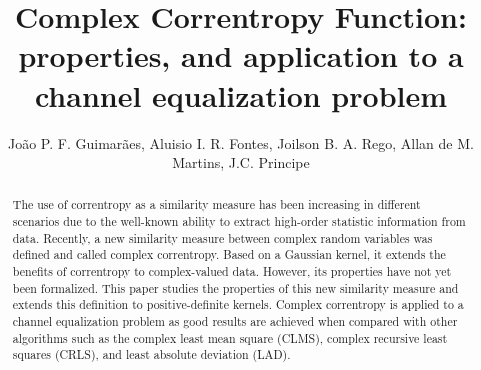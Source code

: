 \documentclass[preprint,12pt]{elsarticle}
\begin{document}
\begin{frontmatter}

\title{Complex Correntropy Function: properties, and application to a channel equalization problem}










\author{Jo\~ao P. F. Guimar\~aes, Aluisio I. R. Fontes, Joilson B. A. Rego, Allan de M. Martins, J.C. Principe}

\address{Federal Institute of Rio Grande do Norte, 59015-300, Natal, Brazil\\
e-mails: \{joao.guimaraes,aluisio.rego\}@ifrn.edu.br}

\address{Department of Computer Engineering and Automation\\
Federal University of Rio Grande do Norte, 59078-900, Natal, Brazil\\
e-mails: \{allan,\,joilson\}@dca.ufrn.br}

\address{Department of Electrical and Computer Engineering\\
University of Florida, Gainesville, FL 32611 USA \\
e-mails: \{principe\}@cnel.ufl.edu}





\begin{abstract}

The use of correntropy as a similarity measure has been increasing in different scenarios due to the well-known ability to extract high-order statistic information from data. Recently, a new similarity measure between complex random variables was defined and called complex correntropy. Based on a Gaussian kernel, it extends the benefits of correntropy to complex-valued data. However, its properties have not yet been formalized. This paper studies the properties of this new similarity measure and extends this definition to positive-definite kernels. Complex correntropy is applied to a channel equalization problem as good results are achieved when compared with other algorithms such as the complex least mean square (CLMS), complex recursive least squares (CRLS), and least absolute deviation (LAD). 



\end{abstract}
\end{frontmatter}
\end{document}
